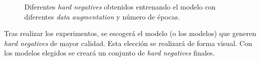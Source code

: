 \begin{figure}[H]
\centering
    \caption{Diferentes \textit{hard negatives} obtenidos entrenando el modelo con diferentes \textit{data augmentation} y número de épocas.} 
\end{figure}
    
Tras realizar los experimentos, se escogerá el modelo (o los modelos) que generen \textit{hard negatives} de mayor calidad. Esta elección se realizará de forma visual. Con los modelos elegidos se creará un conjunto de \textit{hard negatives} finales.







